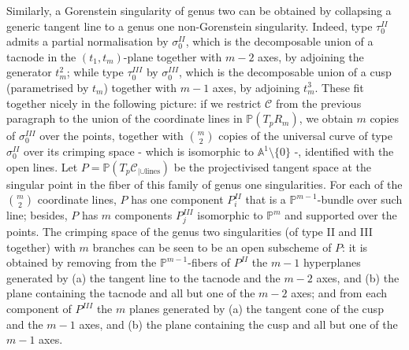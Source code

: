 \documentclass[11pt]{amsart}
\newcommand{\PP}{\mathbb P}
\newcommand{\Aaff}{\mathbb A}
\theoremstyle{plain}
\theoremstyle{definition}
\begin{document}
Similarly, a Gorenstein singularity of genus two can be obtained by collapsing a generic tangent line to a genus one non-Gorenstein singularity. Indeed, type $\tau_0^{II}$ admits a partial normalisation by $\sigma_0^{II}$, which is the decomposable union of a tacnode in the $(t_1,t_m)$-plane together with $m-2$ axes, by adjoining the generator $t_m^2$; while type $\tau_0^{III}$ by $\sigma_0^{III}$, which is the decomposable union of a cusp (parametrised by $t_m$) together with $m-1$ axes, by adjoining $t_m^3$. These fit together nicely in the following picture: if we restrict $\mathcal C$ from the previous paragraph to the union of the coordinate lines in $\PP(T_pR_m)$, we obtain $m$ copies of $\sigma_0^{III}$ over the points, together with $\binom{m}{2}$ copies of the universal curve of type $\sigma_0^{II}$ over its crimping space - which is isomorphic to $\Aaff^1\setminus\{0\}$ -, identified with the open lines. Let $P=\PP(T_p\mathcal C_{|\cup\text{lines}})$ be the projectivised tangent space at the singular point in the fiber of this family of genus one singularities. For each of the $\binom{m}{2}$ coordinate lines, $P$ has one component $P^{II}_i$ that is a $\PP^{m-1}$-bundle over such line; besides, $P$ has $m$ components $P^{III}_j$ isomorphic to $\PP^m$ and supported over the points. The crimping space of the genus two singularities (of type II and III together) with $m$ branches can be seen to be an open subscheme of $P$: it is obtained by removing from the $\PP^{m-1}$-fibers of $P^{II}$ the $m-1$ hyperplanes generated by (a) the tangent line to the tacnode and the $m-2$ axes, and (b) the plane containing the tacnode and all but one of the $m-2$ axes; and from each component of $P^{III}$ the $m$ planes generated by (a) the tangent cone of the cusp and the $m-1$ axes, and (b) the plane containing the cusp and all but one of the $m-1$ axes.
\end{document}
